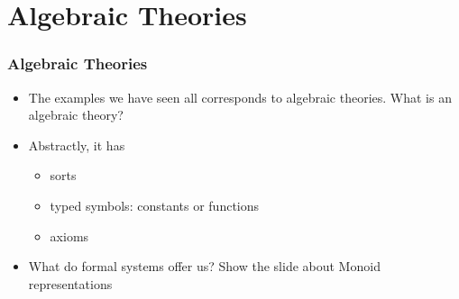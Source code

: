 \documentclass[t,12pt,numbers,fleqn,usenames,xcolor=dvipsnames]{beamer}
\begin{document}
\section{Algebraic Theories}
\begin{frame}
\frametitle{Algebraic Theories}
\begin{itemize}
	\item The examples we have seen all corresponds to algebraic theories. What is an algebraic theory?
	\item Abstractly, it has
	   \begin{itemize}
	   	\item sorts
	   	\item typed symbols: constants or functions 
	   	\item axioms 
	   \end{itemize}
   \item What do formal systems offer us? Show the slide about Monoid representations 
\end{itemize}
\end{frame}
\end{document}
